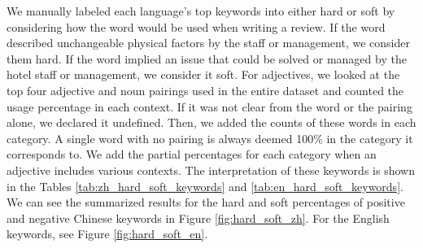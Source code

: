 \documentclass[smallextended,natbib]{svjour3}       %
\begin{document}
    We manually labeled each language's top keywords into either hard or soft by considering how the word would be used when writing a review. If the word described unchangeable physical factors by the staff or management, we consider them hard. If the word implied an issue that could be solved or managed by the hotel staff or management, we consider it soft. For adjectives, we looked at the top four adjective and noun pairings used in the entire dataset and counted the usage percentage in each context. If it was not clear from the word or the pairing alone, we declared it undefined. Then, we added the counts of these words in each category. A single word with no pairing is always deemed 100\% in the category it corresponds to. We add the partial percentages for each category when an adjective includes various contexts. The interpretation of these keywords is shown in the Tables \ref{tab:zh_hard_soft_keywords} and \ref{tab:en_hard_soft_keywords}. We can see the summarized results for the hard and soft percentages of positive and negative Chinese keywords in Figure \ref{fig:hard_soft_zh}. For the English keywords, see Figure \ref{fig:hard_soft_en}.
\end{document}
